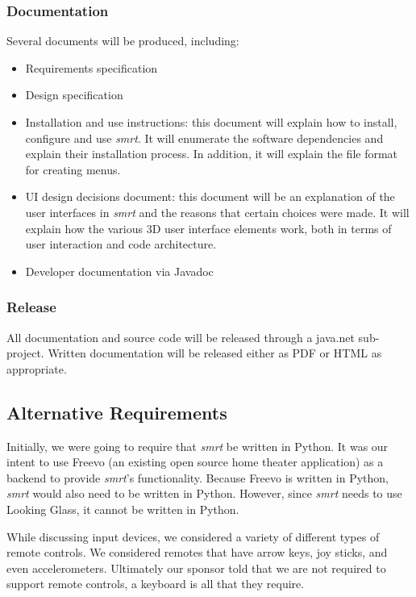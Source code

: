 \documentclass[letterpaper, titlepage, 11pt]{article}
\begin{document}
\subsubsection{Documentation}
Several documents will be produced, including:
\begin{itemize}
\item Requirements specification
\item Design specification
\item Installation and use instructions: this document will explain how to
      install, configure and use \textit{smrt}.  It will enumerate the
      software dependencies and explain their installation process.  In
      addition, it will explain the file format for creating menus.
\item UI design decisions document: this document will be an explanation of
      the user interfaces in \textit{smrt} and the reasons that certain choices
      were made.  It will explain how the various 3D user interface elements
      work, both in terms of user interaction and code architecture.
\item Developer documentation via Javadoc
\end{itemize}

\subsubsection{Release}
All documentation and source code will be released through a java.net
sub-project.  Written documentation will be released either as PDF or
HTML as appropriate.

\subsection{Alternative Requirements}
Initially, we were going to require that \textit{smrt} be written in Python. It
was our intent to use Freevo (an existing open source home theater application)
as a backend to provide \textit{smrt}'s functionality. Because Freevo is written
in Python, \textit{smrt} would also need to be written in Python. However, since
\textit{smrt} needs to use Looking Glass, it cannot be written in Python.

While discussing input devices, we considered a variety of different types of
remote controls. We considered remotes that have arrow keys, joy sticks, and
even accelerometers. Ultimately our sponsor told that we are not required to
support remote controls, a keyboard is all that they require.
\end{document}
